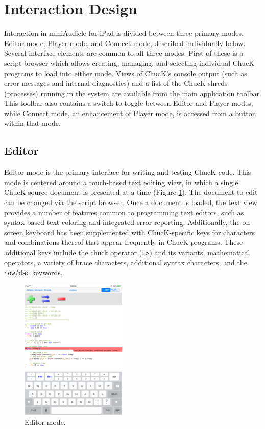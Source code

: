 \documentclass{article}
\begin{document}
\section{Interaction Design}\label{sec:interactionDesign}

Interaction in miniAudicle for iPad is divided between three primary modes, Editor mode, Player mode, and Connect mode, described individually below. 
Several interface elements are common to all three modes.
First of these is a script browser which allows creating, managing, and selecting individual ChucK programs to load into either mode. 
Views of ChucK's console output (such as error messages and internal diagnostics) and a list of the ChucK shreds (processes) running in the system are available from the main application toolbar. 
This toolbar also contains a switch to toggle between Editor and Player modes, while Connect mode, an enhancement of Player mode, is accessed from a button within that mode. 

\subsection{Editor}

Editor mode is the primary interface for writing and testing ChucK code. 
This mode is centered around a touch-based text editing view, in which a single ChucK source document is presented at a time (Figure \ref{fig:editor}). 
The document to edit can be changed via the script browser. 
Once a document is loaded, the text view provides a number of features common to programming text editors, such as syntax-based text coloring and integrated error reporting. 
Additionally, the on-screen keyboard has been supplemented with ChucK-specific keys for characters and combinations thereof that appear frequently in ChucK programs. 
These additional keys include the chuck operator (\texttt{=>}) and its variants, mathematical operators, a variety of brace characters, additional syntax characters, and the \texttt{now}/\texttt{dac} keywords. 

\begin{figure}[h]
	\centering
		\includegraphics[width=0.45\textwidth]{editor.png}
	\caption{Editor mode. }
	\label{fig:editor}
\end{figure}
\end{document}
